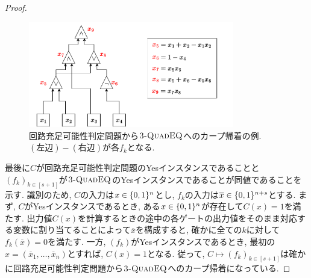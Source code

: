 \begin{proof}
  \begin{figure}[ht]
    \centering
    \includegraphics[width=0.8\textwidth]{images/circuit_to_3-QUADEQ.pdf}
    \caption{回路充足可能性判定問題から$\textsc{3-QuadEQ}$へのカープ帰着の例. $(\text{左辺})-(\text{右辺})$が各$f_k$となる. \label{fig:circuit-to-3-QUADEQ}}
  \end{figure}

  最後に$C$が回路充足可能性判定問題のYesインスタンスであることと$(f_k)_{k\in[s+1]}$が$\textsc{3-QuadEQ}$のYesインスタンスであることが同値であることを示す.
  識別のため, $C$の入力は$x\in\{0,1\}^n$とし, $f_k$の入力は$\overline{x} \in \{0,1\}^{n+s}$とする.
  まず, $C$がYesインスタンスであるとき, ある$x\in\{0,1\}^n$が存在して$C(x)=1$を満たす.
  出力値$C(x)$を計算するときの途中の各ゲートの出力値をそのまま対応する変数に割り当てることによって$\overline{x}$を構成すると, 確かに全ての$k$に対して$f_k(\overline{x})=0$を満たす.
  一方, $(f_k)$がYesインスタンスであるとき, 最初の$x=(\overline{x}_1,\dots,\overline{x}_{n})$とすれば, $C(x)=1$となる.
  従って, $C\mapsto (f_k)_{k\in[s+1]}$は確かに回路充足可能性判定問題から$\textsc{3-QuadEQ}$へのカープ帰着になっている.
\end{proof}


